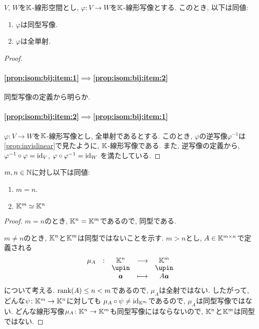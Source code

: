 \begin{prop}
  $V$, $W$を$\mathbb{K}$-線形空間とし,
  $\varphi\colon V\to W$を$\mathbb{K}$-線形写像とする.
  このとき, 以下は同値:
  \begin{enumerate}
  \item
\label{prop:isom:bij:item:1}
$\varphi$は同型写像.
  \item
\label{prop:isom:bij:item:2}
$\varphi$は全単射.
  \end{enumerate}
\end{prop}
\begin{proof}
\paragraph{\ref{prop:isom:bij:item:1}$\implies$\ref{prop:isom:bij:item:2}}
同型写像の定義から明らか.

\paragraph{\ref{prop:isom:bij:item:2}$\implies$\ref{prop:isom:bij:item:1}}
$\varphi\colon V\to W$を$\mathbb{K}$-線形写像とし,
全単射であるとする.
このとき, $\varphi$の逆写像$\varphi^{-1}$は
\cref{prop:invislinear}で見たように,
$\mathbb{K}$-線形写像である.
また, 逆写像の定義から,
$\varphi^{-1}\circ\varphi=\operatorname{id}_V$,
$\varphi\circ\varphi^{-1}=\operatorname{id}_W$
を満たしている.
\end{proof}

\begin{example}
   $m,n\in\mathbb{N}$に対し以下は同値:
  \begin{enumerate}
  \item $m=n$.
  \item $\mathbb{K}^m \simeq \mathbb{K}^n$
  \end{enumerate}
\end{example}
\begin{proof}
  $m=n$のとき, $\mathbb{K}^n=\mathbb{K}^m$であるので, 同型である.

  $m\neq n$のとき, $\mathbb{K}^n$と$\mathbb{K}^m$は同型ではないことを示す.
  $m>n$とし, $A\in \mathbb{K}^{m\times n}$で定義される
  \begin{align*}
    \shazo{\mu_A}{\KK^n}{\KK^m}
    {\aaa}{A\aaa}
  \end{align*}
  について考える.
  $\operatorname{rank}(A)\leq n<m$であるので, $\mu_A$は全射ではない.
  したがって,
  どんな$\psi\colon \mathbb{K}^m\to \mathbb{K}^n$に対しても
  $\mu_A\circ\psi\neq \operatorname{id}_{\mathbb{K}^m}$であるので,
  $\mu_A$は同型写像ではない.
  どんな線形写像$\mu_A\colon \mathbb{K}^n \to \mathbb{K}^m$も同型写像にはならないので,
  $\mathbb{K}^n$と$\mathbb{K}^m$は同型ではない.
\end{proof}

